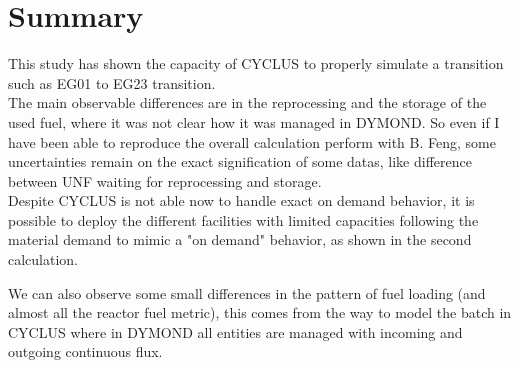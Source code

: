 \documentclass[12pt]{article}
\begin{document}
\section{Summary}
This study has shown the capacity of CYCLUS to
properly simulate a transition such as EG01 to
EG23 transition.\\
The main observable differences are in the
reprocessing and the storage of the used fuel,
where it was not clear how it was managed in
DYMOND. So even if I have been able to reproduce
the overall calculation perform with B. Feng, some
uncertainties remain on the exact signification of
some datas, like difference between UNF waiting for
reprocessing and storage.\\
Despite CYCLUS is not able now to handle exact on
demand behavior, it is possible to deploy the
different facilities with limited capacities
following the material demand to mimic a "on demand"
behavior, as shown in the second calculation.

We can also observe some small differences in the
pattern of fuel loading (and almost all the
reactor fuel metric), this comes from the way to
model the batch in CYCLUS where in DYMOND all
entities are managed with incoming and outgoing
continuous flux.







\end{document}
